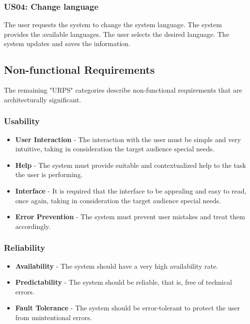 \subsubsection{US04: Change language}

The user requests the system to change the system language.
The system provides the available languages.
The user selects the desired language.
The system updates and saves the information.

\subsection{Non-functional Requirements}

The remaining "URPS" categories describe non-functional requirements that are architecturally significant.

\subsubsection{Usability}

\begin{itemize}
    \item \textbf{User Interaction} - The interaction with the user must be simple and very intuitive, taking in consideration the target audience special needs.
    \item \textbf{Help} - The system must provide suitable and contextualized help to the task the user is performing.
    \item \textbf{Interface} - It is required that the interface to be appealing and easy to read, once again, taking in consideration the target audience special needs.
    \item \textbf{Error Prevention} - The system must prevent user mistakes and treat them accordingly.
\end{itemize}

\subsubsection{Reliability}

\begin{itemize}
    \item \textbf{Availability} - The system should have a very high availability rate.
    \item \textbf{Predictability} - The system should be reliable, that is, free of technical errors.
    \item \textbf{Fault Tolerance} - The system should be error-tolerant to protect the user from unintentional errors.
\end{itemize}

